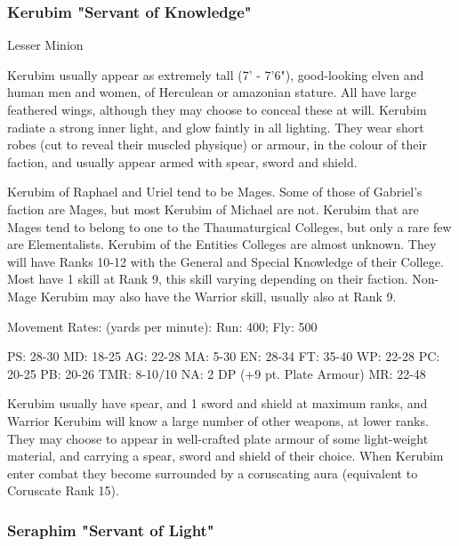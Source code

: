 \subsubsection{Kerubim "Servant of Knowledge"}

\begin{Description}

\item[Class] Lesser Minion

\item[Description] Kerubim usually appear as extremely tall (7' - 7'6"), good-looking elven and human men and women, of Herculean or amazonian stature. All have large feathered wings, although they may choose to conceal these at will. Kerubim radiate a strong inner light, and glow faintly in all lighting. They wear short robes (cut to reveal their muscled physique) or armour, in the colour of their faction, and usually appear armed with spear,  sword and shield.

\item[Talents, Skills and Magic] Kerubim of Raphael and Uriel tend to be Mages. Some of those of Gabriel's faction are Mages, but most Kerubim of Michael are not. Kerubim that are Mages tend to belong to one to the Thaumaturgical Colleges, but only a rare few are Elementalists. Kerubim of the Entities Colleges are almost unknown. They will have Ranks 10-12 with the General and Special Knowledge of their College. Most have 1 skill at Rank 9, this skill varying depending on their faction. Non-Mage Kerubim may also have the Warrior skill, usually also at Rank 9.

Movement Rates: (yards per minute): Run: 400; Fly: 500

PS: 28-30		MD: 18-25	AG: 22-28	MA: 5-30
EN: 28-34	FT: 35-40	WP: 22-28	PC: 20-25
PB: 20-26	TMR: 8-10/10	NA: 2 DP (+9 pt. Plate Armour)
MR: 22-48

\item[Weapons] Kerubim usually have spear, and 1 sword and shield at
  maximum ranks, and Warrior Kerubim will know a large number of other
  weapons, at lower ranks. They may choose to appear in well-crafted
  plate armour of some light-weight material, and carrying a spear,
  sword and shield of their choice. When Kerubim enter combat they
  become surrounded by a coruscating aura (equivalent to Coruscate
  Rank 15).
\end{Description}

\subsubsection{Seraphim "Servant of Light"}

